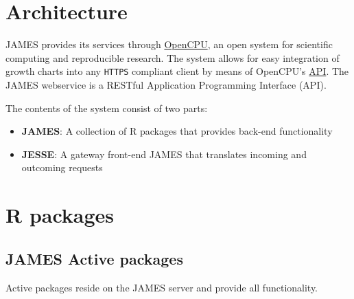 \documentclass[
]{book}
\providecommand{\tightlist}{%
  \setlength{\itemsep}{0pt}\setlength{\parskip}{0pt}}
\begin{document}
\hypertarget{architecture}{%
\section{Architecture}\label{architecture}}

JAMES provides its services through \href{https://www.opencpu.org}{OpenCPU}, an open system for scientific computing and reproducible research. The system allows for easy integration of growth charts into any \texttt{HTTPS} compliant client by means of OpenCPU's \href{https://www.opencpu.org/api.html}{API}. The JAMES webservice is a RESTful Application Programming Interface (API).

The contents of the system consist of two parts:

\begin{itemize}
\tightlist
\item
  \textbf{JAMES}: A collection of R packages that provides back-end functionality
\item
  \textbf{JESSE}: A gateway front-end JAMES that translates incoming and outcoming requests
\end{itemize}

\hypertarget{r-packages}{%
\section{R packages}\label{r-packages}}

\hypertarget{james-active-packages}{%
\subsection{JAMES Active packages}\label{james-active-packages}}

Active packages reside on the JAMES server and provide all functionality.
\end{document}
